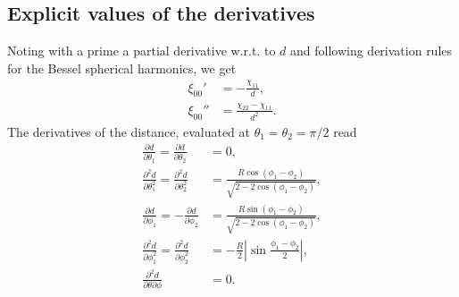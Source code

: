 \documentclass[useAMS,usenatbib,babel,superscriptaddress]{mnras}
\begin{document}
\subsection{Explicit values of the derivatives}
Noting with a prime a partial derivative w.r.t. to $d$ and following derivation rules for the Bessel spherical harmonics, we get
\begin{align}
  \xi_{00}' &= -\frac{\chi_{11}}{d}, \\
  \xi_{00}'' &= \frac{\chi_{22}-\chi_{11}}{d^2}.
\end{align}
The derivatives of the distance, evaluated at $\theta_1=\theta_2=\pi/2$ read
\begin{align}
  \frac{\partial d}{\partial \theta_1} = \frac{\partial d}{\partial \theta_2} &= 0, \\
  \frac{\partial^2 d}{\partial\theta_1^2} = \frac{\partial^2 d}{\partial\theta_2^2} & = \frac{R \cos(\phi_1-\phi_2)}{\sqrt{2-2\cos(\phi_1-\phi_2)}},\\
  \frac{\partial d}{\partial \phi_1} = -\frac{\partial d}{\partial \phi_2} &= \frac{R\sin(\phi_1-\phi_2)}{\sqrt{2-2\cos(\phi_1-\phi_2)}}, \\
  \frac{\partial^2 d}{\partial \phi_1^2} = \frac{\partial^2 d}{\partial \phi_2^2} &= -\frac{R}{2}\left|\sin \frac{\phi_1-\phi_2}{2}\right|, \\
  \frac{\partial^2 d}{\partial\theta\partial\phi} & = 0.
\end{align}
\end{document}
